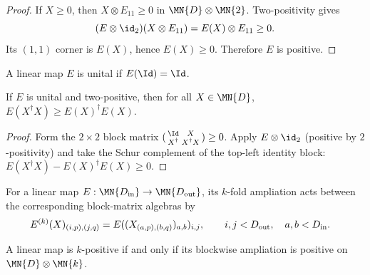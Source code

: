 \begin{proof}
    \leanok
    If $X\geq0$, then $X\otimes E_{11}\geq0$ in
    $\MN{D}\otimes\MN{2}$. Two-positivity gives
    \[
        (E\otimes\id_2)(X\otimes E_{11})=E(X)\otimes E_{11}\geq0.
    \]
    Its $(1,1)$ corner is $E(X)$, hence $E(X)\geq0$. Therefore $E$ is
    positive.
\end{proof}

\begin{definition}\label{def:unital_linear_map}
    \leanok
    A linear map $E$ is unital if $E(\Id)=\Id$.
\end{definition}

\begin{theorem}\label{thm:kadison_schwarz_2positive}
    \leanok
    If $E$ is unital and two-positive, then for all $X\in\MN{D}$,
    $E(X^\dagger X)\ge E(X)^\dagger E(X)$.
\end{theorem}

\begin{proof}
    \leanok
    Form the $2\times 2$ block matrix
    $(\begin{smallmatrix} \Id & X \\ X^\dagger & X^\dagger X \end{smallmatrix})\ge0$.
    Apply $E\otimes\id_{2}$ (positive by $2$-positivity) and take the Schur
    complement of the top-left identity block:
    $E(X^\dagger X)-E(X)^\dagger E(X)\ge0$.
\end{proof}

\begin{definition}\label{def:blockwise_ampliation}
    \leanok
    For a linear map
    $E : \MN{D_{\rm in}}\to\MN{D_{\rm out}}$, its $k$-fold ampliation acts
    between the corresponding block-matrix algebras by
    \begin{align}
        E^{(k)}(X)_{(i,p),(j,q)}
         & =E((X_{(a,p),(b,q)})_{a,b})_{i,j},
        \qquad i,j<D_{\rm out},\quad a,b<D_{\rm in}.
        \label{eq:schwarz_blockwise_ampliation}
    \end{align}
\end{definition}

\begin{theorem}
    \leanok
    A linear map is $k$-positive if and only if its blockwise ampliation is
    positive on $\MN{D}\otimes\MN{k}$.
\end{theorem}

